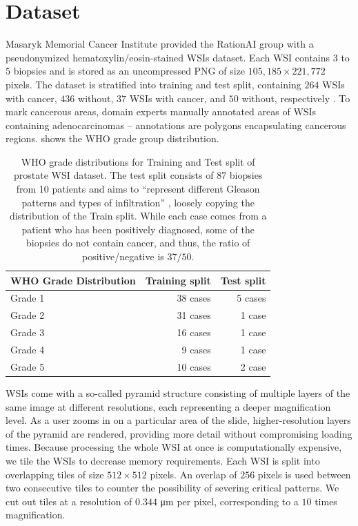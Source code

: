 \section{Dataset}\label{sec:dataset}

Masaryk Memorial Cancer Institute provided the RationAI group with a pseudonymized hematoxylin/eosin-stained WSIs dataset.
Each WSI contains $3$ to $5$ biopsies and is stored as an uncompressed PNG of size $105,185 \times 221,772$ pixels.
The dataset is stratified into training and test split, containing $264$ WSIs with cancer, $436$ without, $37$ WSIs with cancer, and $50$ without, respectively \cite{gallo}.
To mark cancerous areas, domain experts manually annotated areas of WSIs containing adenocarcinomas -- annotations are polygons encapsulating cancerous regions.
 shows the WHO grade group distribution.

\begin{table}
\centering
{}
\begin{tabular}{@{} l r r @{}}\toprule
WHO Grade Distribution & Training split & Test split \\ 
\midrule
Grade 1         & 38 cases            & 5 cases      \\
Grade 2         & 31 cases            & 1 case       \\
Grade 3         & 16 cases            & 1 case       \\
Grade 4         & 9 cases             & 1 case       \\
Grade 5         & 10 cases            & 2 case       \\
\bottomrule
\end{tabular}
\caption{WHO grade distributions for Training and Test split of prostate WSI dataset. The test split consists of $87$ biopsies from 10 patients and aims to ``represent different Gleason patterns
and types of infiltration'' \cite{gallo}, loosely copying the distribution of the Train split. While each case comes from a patient who has been positively diagnosed, some of the biopsies do not contain cancer, and thus, the ratio of positive/negative is $37/50$.}
\label{tab:who_grade_distribution}
\end{table}

WSIs come with a so-called pyramid structure consisting of multiple layers of the same image at different resolutions, each representing a deeper magnification level.
As a user zooms in on a particular area of the slide, higher-resolution layers of the pyramid are rendered, providing more detail without compromising loading times.
Because processing the whole WSI at once is computationally expensive, we tile the WSIs to decrease memory requirements.
Each WSI is split into overlapping tiles of size $512 \times 512$ pixels.
An overlap of $256$ pixels is used between two consecutive tiles to counter the possibility of severing critical patterns.
We cut out tiles at a resolution of $0.344$ \si{\micro\meter} per pixel, corresponding to a $10$ times magnification.


